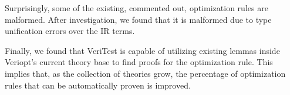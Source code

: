 \documentclass[conference,a4paper,english,10pt]{IEEEtran}[2015/08/26]
\begin{document}
Surprisingly, some of the existing, commented out, optimization rules are malformed. After investigation, we found that it is malformed 
due to type unification errors over the IR terms.

Finally, we found that VeriTest is capable of utilizing existing lemmas inside Veriopt's current theory base to find proofs for the 
optimization rule. This implies that, as the collection of theories grow, the percentage of optimization rules that can be 
automatically proven is improved.







%
\end{document}
